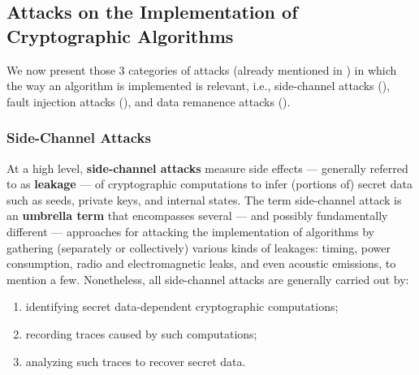 \subsection{Attacks on the Implementation of Cryptographic Algorithms}\label{sec:security_of_cryptographic_algorithms:attacks}

We now present those 3 categories of attacks (already mentioned in ) in which the way an algorithm is implemented is relevant, i.e., side-channel attacks (), fault injection attacks (), and data remanence attacks ().


\subsubsection{Side-Channel Attacks}\label{sec:security_of_cryptographic_algorithms:attacks:sca}

At a high level, \textbf{side-channel attacks} measure side effects --- generally referred to as \textbf{leakage} --- of cryptographic computations to infer (portions of) secret data such as seeds, private keys, and internal states. The term side-channel attack is an \textbf{umbrella term} that encompasses several --- and possibly fundamentally different --- approaches for attacking the implementation of algorithms by gathering (separately or collectively) various kinds of leakages: timing, power consumption, radio and electromagnetic leaks, and even acoustic emissions, to mention a few. Nonetheless, all side-channel attacks are generally carried out by:

\begin{enumerate}
	\item identifying secret data-dependent cryptographic computations;
	\item recording traces caused by such computations;
	\item analyzing such traces to recover secret data.
\end{enumerate}

